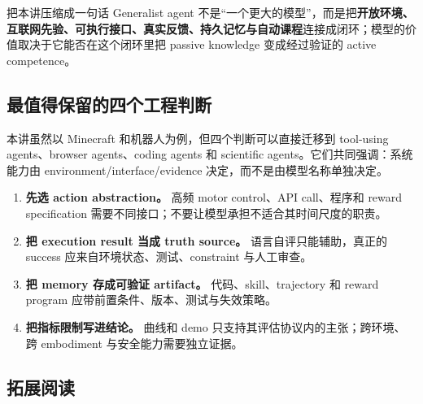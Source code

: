 \begin{importantbox}{把本讲压缩成一句话}
Generalist agent 不是“一个更大的模型”，而是把\textbf{开放环境、互联网先验、可执行接口、真实反馈、持久记忆与自动课程}连接成闭环；模型的价值取决于它能否在这个闭环里把 passive knowledge 变成经过验证的 active competence。
\end{importantbox}

\subsection{最值得保留的四个工程判断}

本讲虽然以 Minecraft 和机器人为例，但四个判断可以直接迁移到 tool-using agents、browser agents、coding agents 和 scientific agents。它们共同强调：系统能力由 environment/interface/evidence 决定，而不是由模型名称单独决定。

\begin{enumerate}
  \item \textbf{先选 action abstraction。} 高频 motor control、API call、程序和 reward specification 需要不同接口；不要让模型承担不适合其时间尺度的职责。
  \item \textbf{把 execution result 当成 truth source。} 语言自评只能辅助，真正的 success 应来自环境状态、测试、constraint 与人工审查。
  \item \textbf{把 memory 存成可验证 artifact。} 代码、skill、trajectory 和 reward program 应带前置条件、版本、测试与失效策略。
  \item \textbf{把指标限制写进结论。} 曲线和 demo 只支持其评估协议内的主张；跨环境、跨 embodiment 与安全能力需要独立证据。
\end{enumerate}

\subsection{拓展阅读}

